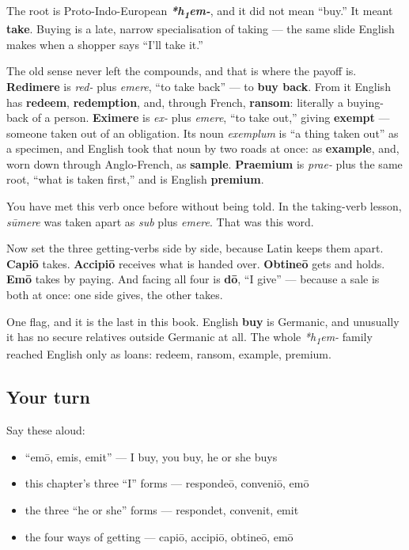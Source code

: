 \begin{cousinweb}
The root is Proto-Indo-European \emph{\textbf{*h\textsubscript{1}em-}}, and it did not mean \textquotedblleft{}buy.\textquotedblright{} It meant \textbf{take}. Buying is a late, narrow specialisation of taking — the same slide English makes when a shopper says \textquotedblleft{}I'll take it.\textquotedblright{}

The old sense never left the compounds, and that is where the payoff is. \textbf{Redimere} is \emph{red-} plus \emph{emere}, \textquotedblleft{}to take back\textquotedblright{} — to \textbf{buy back}. From it English has \textbf{redeem}, \textbf{redemption}, and, through French, \textbf{ransom}: literally a buying-back of a person. \textbf{Eximere} is \emph{ex-} plus \emph{emere}, \textquotedblleft{}to take out,\textquotedblright{} giving \textbf{exempt} — someone taken out of an obligation. Its noun \emph{exemplum} is \textquotedblleft{}a thing taken out\textquotedblright{} as a specimen, and English took that noun by two roads at once: as \textbf{example}, and, worn down through Anglo-French, as \textbf{sample}. \textbf{Praemium} is \emph{prae-} plus the same root, \textquotedblleft{}what is taken first,\textquotedblright{} and is English \textbf{premium}.

You have met this verb once before without being told. In the taking-verb lesson, \emph{sūmere} was taken apart as \emph{sub} plus \emph{emere}. That was this word.

Now set the three getting-verbs side by side, because Latin keeps them apart. \textbf{Capiō} takes. \textbf{Accipiō} receives what is handed over. \textbf{Obtineō} gets and holds. \textbf{Emō} takes by paying. And facing all four is \textbf{dō}, \textquotedblleft{}I give\textquotedblright{} — because a sale is both at once: one side gives, the other takes.

One flag, and it is the last in this book. English \textbf{buy} is Germanic, and unusually it has no secure relatives outside Germanic at all. The whole \emph{*h\textsubscript{1}em-} family reached English only as loans: redeem, ransom, example, premium.
\end{cousinweb}

\subsection*{Your turn}
Say these aloud:

\begin{itemize}
\raggedright
  \item \textquotedblleft{}emō, emis, emit\textquotedblright{} — I buy, you buy, he or she buys
  \item this chapter's three \textquotedblleft{}I\textquotedblright{} forms — respondeō, conveniō, emō
  \item the three \textquotedblleft{}he or she\textquotedblright{} forms — respondet, convenit, emit
  \item the four ways of getting — capiō, accipiō, obtineō, emō
\end{itemize}

